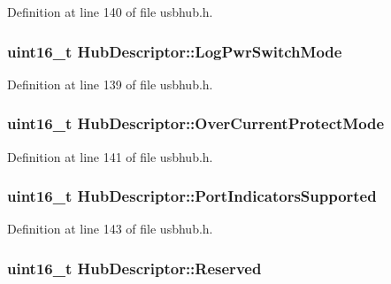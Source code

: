\-Definition at line 140 of file usbhub.\-h.

\hypertarget{struct_hub_descriptor_a68084f6fd86bff9598573ac845be6fe3}{
\subsubsection[{\-Log\-Pwr\-Switch\-Mode}]{\setlength{\rightskip}{0pt plus 5cm}uint16\-\_\-t {\bf \-Hub\-Descriptor\-::\-Log\-Pwr\-Switch\-Mode}}}\label{struct_hub_descriptor_a68084f6fd86bff9598573ac845be6fe3}


\-Definition at line 139 of file usbhub.\-h.

\hypertarget{struct_hub_descriptor_a0ac02abaa7e8aeec5f1520a58c9eecb3}{
\subsubsection[{\-Over\-Current\-Protect\-Mode}]{\setlength{\rightskip}{0pt plus 5cm}uint16\-\_\-t {\bf \-Hub\-Descriptor\-::\-Over\-Current\-Protect\-Mode}}}\label{struct_hub_descriptor_a0ac02abaa7e8aeec5f1520a58c9eecb3}


\-Definition at line 141 of file usbhub.\-h.

\hypertarget{struct_hub_descriptor_a6478c259c7397e89d50b42f6f3d4f4e4}{
\subsubsection[{\-Port\-Indicators\-Supported}]{\setlength{\rightskip}{0pt plus 5cm}uint16\-\_\-t {\bf \-Hub\-Descriptor\-::\-Port\-Indicators\-Supported}}}\label{struct_hub_descriptor_a6478c259c7397e89d50b42f6f3d4f4e4}


\-Definition at line 143 of file usbhub.\-h.

\hypertarget{struct_hub_descriptor_a0c3292fe67fdbdab6ceac8b198ef44bf}{
\subsubsection[{\-Reserved}]{\setlength{\rightskip}{0pt plus 5cm}uint16\-\_\-t {\bf \-Hub\-Descriptor\-::\-Reserved}}}\label{struct_hub_descriptor_a0c3292fe67fdbdab6ceac8b198ef44bf}


